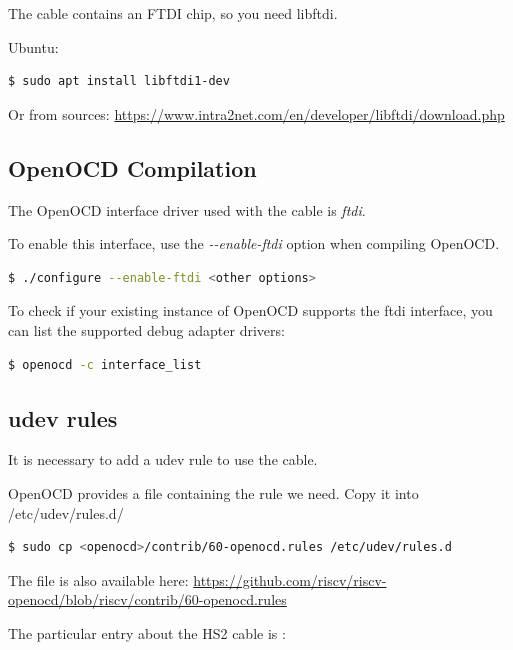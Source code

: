 \documentclass{article}
\begin{document}
    The cable contains an FTDI chip, so you need libftdi.
    
    Ubuntu:
    
    \begin{lstlisting}[language=bash]
    $ sudo apt install libftdi1-dev
    \end{lstlisting}
    
    Or from sources: \url{https://www.intra2net.com/en/developer/libftdi/download.php}
    
    \subsection{OpenOCD Compilation}
    
    The OpenOCD interface driver used with the cable is \textit{ftdi}.
    
    To enable this interface, use the \textit{-{}-enable-ftdi} option when compiling OpenOCD.
    
    \begin{lstlisting}[language=bash]
    $ ./configure --enable-ftdi <other options>
    \end{lstlisting}
    
    To check if your existing instance of OpenOCD supports the ftdi interface, you can list the supported debug adapter drivers:
    
    \begin{lstlisting}[language=bash]
    $ openocd -c interface_list
    \end{lstlisting}
    
    \subsection{udev rules}
    
    It is necessary to add a udev rule to use the cable.
    
    OpenOCD provides a file containing the rule we need. Copy it into /etc/udev/rules.d/
    
    \begin{lstlisting}[language=bash]
    $ sudo cp <openocd>/contrib/60-openocd.rules /etc/udev/rules.d
    \end{lstlisting}
    
    The file is also available here: \url{https://github.com/riscv/riscv-openocd/blob/riscv/contrib/60-openocd.rules}
    
    The particular entry about the HS2 cable is :
    
\end{document}
